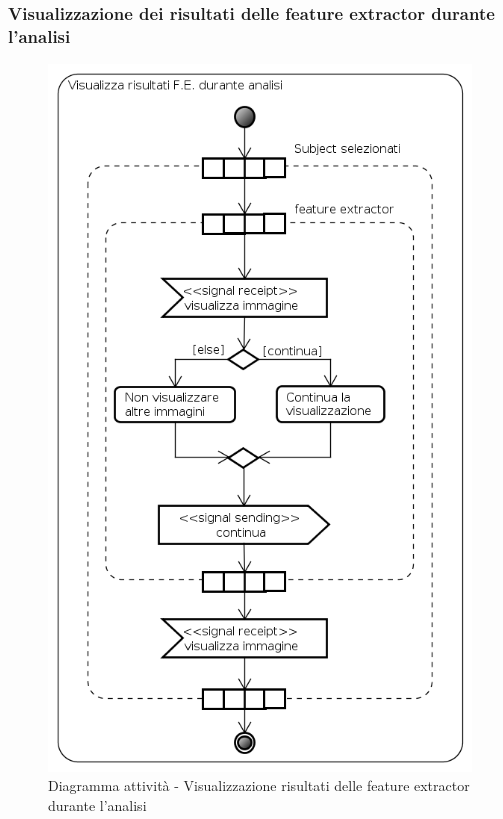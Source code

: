 \subsubsection{Visualizzazione dei risultati delle feature extractor durante l'analisi}
\label{risultati_fe_durante_analisi}
\begin{figure}[!h]
\begin{center}
\includegraphics[scale=0.6]{./img/Diagrammi_Attivita/Visualizza_risultati_durante_analisi}
\caption{Diagramma attività - Visualizzazione risultati delle feature extractor durante l'analisi}
\end{center}
\end{figure}
